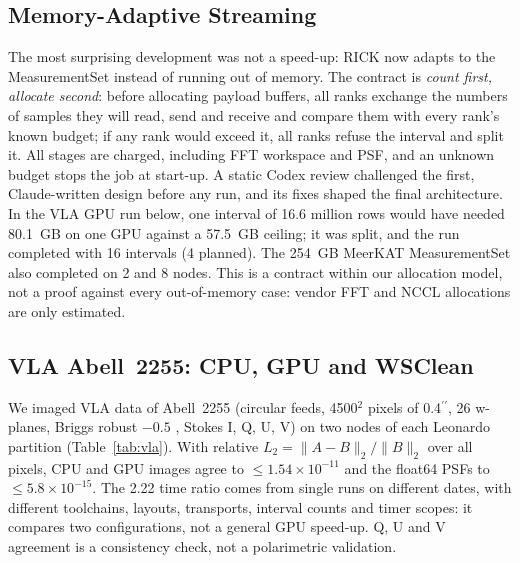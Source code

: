 \documentclass[11pt,twoside]{article}
\begin{document}

\subsection{Memory-Adaptive Streaming}

The most surprising development was not a speed-up: RICK now adapts to
the MeasurementSet instead of running out of memory. The contract is
\emph{count first, allocate second}: before allocating payload buffers, all
ranks exchange the numbers of samples they will read, send and receive and
compare them with every rank's known budget; if any rank would exceed it, all
ranks refuse the interval and split it. All stages are charged, including FFT
workspace and PSF, and an unknown budget stops the job at start-up. A static
Codex review challenged the first, Claude-written design before any run, and
its fixes shaped the final architecture. In the VLA GPU run below, one
interval of 16.6 million rows would have needed 80.1~GB on one GPU against a
57.5~GB ceiling; it was split, and the run completed with 16 intervals (4
planned). The 254~GB MeerKAT MeasurementSet also completed on 2 and 8 nodes.
This is a contract within our allocation model, not a proof against every
out-of-memory case: vendor FFT and NCCL allocations are only estimated.

\subsection{VLA Abell~2255: CPU, GPU and WSClean}

We imaged VLA data of Abell~2255 (circular feeds, 4500$^2$ pixels of
0.4$^{\prime\prime}$, 26 w-planes, Briggs robust $-0.5$ \citep{Briggs1995},
Stokes I, Q, U, V) on two nodes of each Leonardo partition
(Table~\ref{tab:vla}). With relative $L_2 = \|A-B\|_2/\|B\|_2$ over all
pixels, CPU and GPU images agree to $\leq1.54\times10^{-11}$ and the float64
PSFs to $\leq5.8\times10^{-15}$. The 2.22 time ratio comes from single runs on
different dates, with different toolchains, layouts, transports, interval
counts and timer scopes: it compares two configurations, not a general GPU
speed-up. Q, U and V agreement is a consistency check, not a polarimetric
validation.
\end{document}

